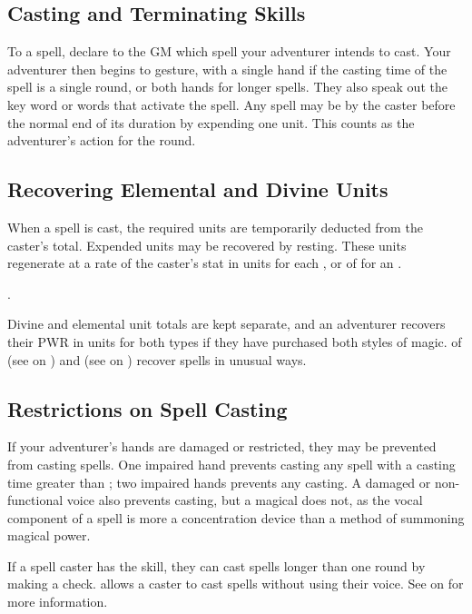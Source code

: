 \begin{multicols}{2}
\subsection{Casting and Terminating Skills}
To  a spell, declare to the GM which spell your adventurer intends to cast. Your adventurer then begins to gesture, with a single hand if the casting time of the spell is a single round, or both hands for longer spells. They also speak out the key word or words that activate the spell. Any spell may be  by the caster before
the normal end of its duration by expending one unit. This counts as the adventurer's action for the round.
\subsection{Recovering Elemental and Divine Units}
When a spell is cast, the required units are temporarily deducted from the caster's total. Expended units may be recovered by resting. These units regenerate at a rate of the caster's \PWR stat in units for each  , or  of  for an .

. 

Divine and elemental unit totals are kept separate, and an adventurer recovers their PWR in units for both types if they have purchased both styles of magic.  of  (see  on \pageref{ch:rudri}) and  (see  on \pageref{ch:rudri}) recover spells in unusual ways.
\subsection{Restrictions on Spell Casting}
If your adventurer's hands are damaged or restricted, they may be prevented from casting spells. One impaired hand prevents casting any spell with a casting time greater than ; two impaired hands prevents any casting. A damaged or non-functional voice also prevents casting, but a magical  does not, as the vocal component of a spell is more a concentration device than a method of summoning magical power. 

If a spell caster has the  skill, they can cast spells longer than one round by making a check.  allows a caster to cast spells without using their voice. See  on  for more information.


\end{multicols}
